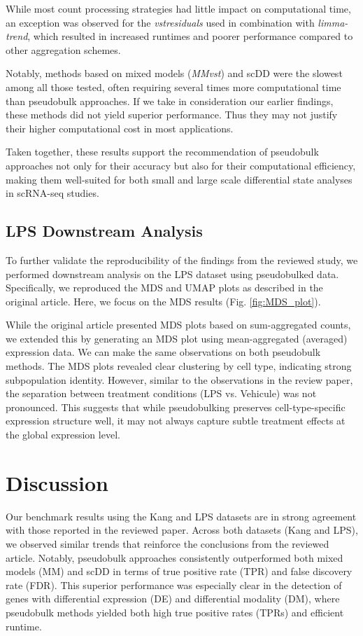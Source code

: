 \documentclass[a4paper, 11pt, twocolumn]{article}
\begin{document}
\begin{multicols}{2}
While most count processing strategies had little impact on computational time, an exception was observed for the \textit{vstresiduals} used in combination with \textit{limma-trend}, which resulted in increased runtimes and poorer performance compared to other aggregation schemes. 

Notably, methods based on mixed models (\textit{MMvst}) and scDD were the slowest among all those tested, often requiring several times more computational time than pseudobulk approaches. If we take in consideration our earlier findings, these methods did not yield superior performance. Thus they may not justify their higher computational cost in most applications.

Taken together, these results support the recommendation of pseudobulk approaches not only for their accuracy but also for their computational efficiency, making them well-suited for both small and large scale differential state analyses in scRNA-seq studies.

\subsection{LPS Downstream Analysis}

To further validate the reproducibility of the findings from the reviewed study, we performed downstream analysis on the LPS dataset using pseudobulked data. Specifically, we reproduced the MDS and UMAP plots as described in the original article. Here, we focus on the MDS results (Fig. \ref{fig:MDS_plot}).

While the original article presented MDS plots based on sum-aggregated counts, we extended this by generating an MDS plot using mean-aggregated (averaged) expression data. We can make the same observations on both pseudobulk methods. The MDS plots revealed clear clustering by cell type, indicating strong subpopulation identity. However, similar to the observations in the review paper, the separation between treatment conditions (LPS vs. Vehicule) was not pronounced. This suggests that while pseudobulking preserves cell-type-specific expression structure well, it may not always capture subtle treatment effects at the global expression level.

\section{Discussion}

Our benchmark results using the Kang and LPS datasets are in strong agreement with those reported in the reviewed paper. Across both datasets (Kang and LPS), we observed similar trends that reinforce the conclusions from the reviewed article. Notably, pseudobulk approaches consistently outperformed both mixed models (MM) and scDD in terms of true positive rate (TPR) and false discovery rate (FDR). This superior performance was especially clear in the detection of genes with differential expression (DE) and differential modality (DM), where pseudobulk methods yielded both high true positive rates (TPRs) and efficient runtime.


\end{multicols}
\end{document}
